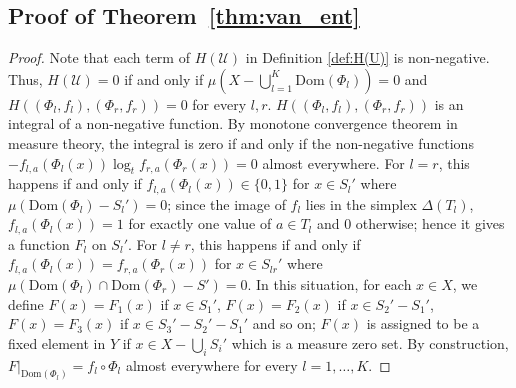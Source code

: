 \documentclass{article}
\theoremstyle{plain}
\theoremstyle{definition}
\theoremstyle{remark}
\newcommand{\cU}{\mathcal{U}}
\newcommand{\Dom}{\mathrm{Dom}}
\begin{document}
\subsection{Proof of Theorem~\ref{thm:van_ent}}
\label{app:proof:thm:van_ent}
\begin{proof}
	
	Note that each term of $H(\cU)$ in Definition \ref{def:H(U)} is non-negative. Thus, $H(\cU)=0$ if and only if $\mu(X - \bigcup_{l=1}^K \Dom(\Phi_l))=0$ and $H((\Phi_l,f_l),(\Phi_r,f_r))=0$ for every $l,r$. $H((\Phi_l,f_l),(\Phi_r,f_r))$ is an integral of a non-negative function. By monotone convergence theorem in measure theory, the integral is zero if and only if the non-negative functions $-f_{l,a} (\Phi_l(x)) \log_t f_{r,a} (\Phi_r(x)) = 0$ almost everywhere. For $l=r$, this happens if and only if $f_{l,a}(\Phi_l(x)) \in \{0,1\}$ for $x \in S_l'$ where $\mu(\Dom(\Phi_l) - S_l')=0$; since the image of $f_l$ lies in the simplex $\Delta(T_l)$, $f_{l,a}(\Phi_l(x)) = 1$ for exactly one value of $a \in T_l$ and $0$ otherwise; hence it gives a function $F_l$ on $S_l'$. For $l\not=r$, this happens if and only if $f_{l,a}(\Phi_l(x)) = f_{r,a}(\Phi_r(x))$ for $x \in S_{lr}'$ where $\mu(\Dom(\Phi_l) \cap \Dom(\Phi_r) - S')=0$. In this situation, for each $x \in X$, we define $F(x) = F_1(x)$ if $x \in S_1'$, $F(x) = F_2(x)$ if $x \in S_2'-S_1'$, $F(x) = F_3(x)$ if $x \in S_3'-S_2'-S_1'$ and so on; $F(x)$ is assigned to be a fixed element in $Y$ if $x \in X-\bigcup_i S_i'$ which is a measure zero set. By construction, $F|_{\Dom(\Phi_l)} = f_l \circ \Phi_l$ almost everywhere for every $l = 1,\ldots,K$. 
\end{proof}
\end{document}
